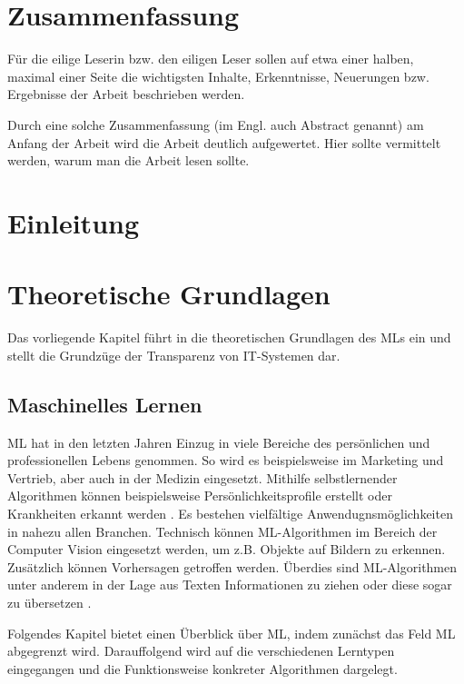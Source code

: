 \documentclass[
    fontsize=12pt,
    headings=small,
    twoside=false, %
    parskip=half,           %
    bibliography=totoc,
    numbers=noenddot,       %
    open=any,               %
    ]{scrreprt}
\begin{document}
\chapter*{Zusammenfassung}

Für die eilige Leserin bzw. den eiligen Leser sollen auf etwa einer halben, maximal einer Seite die wichtigsten Inhalte, Erkenntnisse, Neuerungen bzw. Ergebnisse der Arbeit beschrieben werden.

Durch eine solche Zusammenfassung (im Engl. auch Abstract genannt) am Anfang der Arbeit wird die Arbeit deutlich aufgewertet. Hier sollte vermittelt werden, warum man die Arbeit lesen sollte.


\chapter{Einleitung}




\chapter{Theoretische Grundlagen}
Das vorliegende Kapitel führt in die theoretischen Grundlagen des MLs ein und stellt die Grundzüge der Transparenz von IT-Systemen dar.

\section{Maschinelles Lernen}
ML hat in den letzten Jahren Einzug in viele Bereiche des persönlichen und professionellen Lebens genommen. So wird es beispielsweise im Marketing und Vertrieb, aber auch in der Medizin eingesetzt. Mithilfe selbstlernender Algorithmen können beispielsweise Persönlichkeitsprofile erstellt oder Krankheiten erkannt werden \cite{strobel2019aspects, Wuttke.2022}. Es bestehen vielfältige Anwendugnsmöglichkeiten in nahezu allen Branchen. Technisch können ML-Algorithmen im Bereich der Computer Vision eingesetzt werden, um z.B. Objekte auf Bildern zu erkennen. Zusätzlich können Vorhersagen getroffen werden. Überdies sind ML-Algorithmen unter anderem in der Lage aus Texten Informationen zu ziehen oder diese sogar zu übersetzen \cite{shinde}.

Folgendes Kapitel bietet einen Überblick über ML, indem zunächst das Feld ML abgegrenzt wird. Darauffolgend wird auf die verschiedenen Lerntypen eingegangen und die Funktionsweise konkreter Algorithmen dargelegt.
\end{document}
